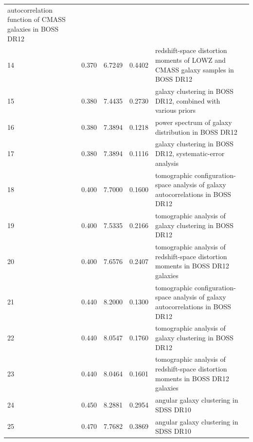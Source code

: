 \begin{table}
\begin{tabular}{llllp{70mm}l}
    autocorrelation function of CMASS galaxies in BOSS DR12 &
    \cite{2016MNRAS.461.3781C} \\
    14 & 0.370 &  6.7249 & 0.4402 &
    redshift-space distortion moments of LOWZ and CMASS galaxy samples in BOSS DR12 &
    \cite{2017MNRAS.471.2370C} \\
    15 & 0.380 &  7.4435 & 0.2730 &
    galaxy clustering in BOSS DR12, combined with various priors &
    \cite{2017MNRAS.470.2617A} \\
    16 & 0.380 &  7.3894 & 0.1218 &
    power spectrum of galaxy distribution in BOSS DR12 &
    \cite{2017MNRAS.464.3409B} \\
    17 & 0.380 &  7.3894 & 0.1116 &
    galaxy clustering in BOSS DR12, systematic-error analysis &
    \cite{2018MNRAS.477.1153V} \\
    18 & 0.400 &  7.7000 & 0.1600 &
    tomographic configuration-space analysis of galaxy autocorrelations in BOSS DR12 &
    \cite{2017MNRAS.469.3762W} \\
    19 & 0.400 &  7.5335 & 0.2166 &
    tomographic analysis of galaxy clustering in BOSS DR12 &
    \cite{2018MNRAS.481.3160W} \\
    20 & 0.400 &  7.6576 & 0.2407 &
    tomographic analysis of redshift-space distortion moments in BOSS DR12 galaxies &
    \cite{2017MNRAS.466..762Z} \\
    21 & 0.440 &  8.2000 & 0.1300 &
    tomographic configuration-space analysis of galaxy autocorrelations in BOSS DR12 &
    \cite{2017MNRAS.469.3762W} \\
    22 & 0.440 &  8.0547 & 0.1760 &
    tomographic analysis of galaxy clustering in BOSS DR12 &
    \cite{2018MNRAS.481.3160W} \\
    23 & 0.440 &  8.0464 & 0.1601 &
    tomographic analysis of redshift-space distortion moments in BOSS DR12 galaxies &
    \cite{2017MNRAS.466..762Z} \\
    24 & 0.450 &  8.2881 & 0.2954 &
    angular galaxy clustering in SDSS DR10 &
    \cite{2016PhRvD..93b3530C} \\
    25 & 0.470 &  7.7682 & 0.3869 &
    angular galaxy clustering in SDSS DR10 &
    \cite{2016PhRvD..93b3530C} \\
  \end{tabular}
\end{table}
